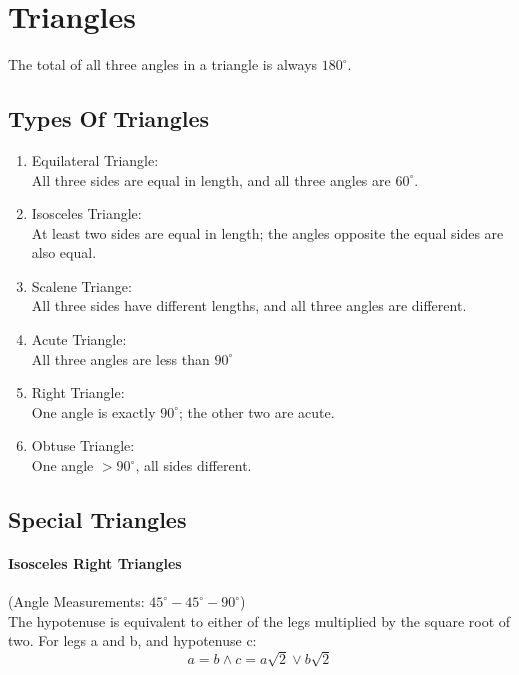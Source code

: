 \documentclass{article}
\begin{document}
\section{Triangles}
The total of all three angles in a triangle is always $180^{\circ}$.

\subsection{Types Of Triangles}
\begin{enumerate}
  \item Equilateral Triangle:\\
    All three sides are equal in length, and all three angles are
    $60^{\circ}$.

  \item Isosceles Triangle:\\
    At least two sides are equal in length; the angles opposite the equal
    sides are also equal.

  \item Scalene Triange:\\
    All three sides have different lengths, and all three angles are
    different.

  \item Acute Triangle:\\
    All three angles are less than $90^{\circ}$

  \item Right Triangle:\\
    One angle is exactly $90^{\circ}$; the other two are acute.

  \item Obtuse Triangle:\\
    One angle $> 90^\circ$, all sides different.
\end{enumerate}

\subsection{Special Triangles}
\paragraph{Isosceles Right Triangles}
(Angle Measurements: $45^\circ-45^\circ-90^\circ$)\\
The hypotenuse is equivalent to either of the legs multiplied by the
square root of two.
For legs a and b, and hypotenuse c:
\[a = b \land c = a\sqrt{2} \lor b\sqrt{2}\]
\end{document}
